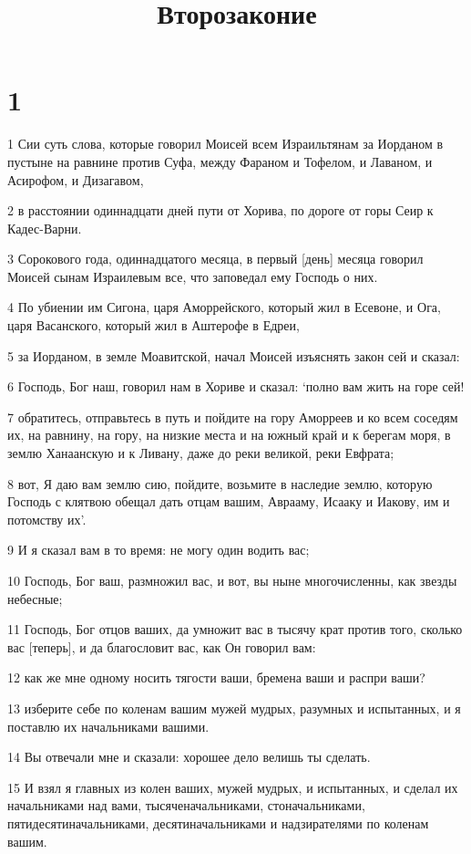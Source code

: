 

\title{Второзаконие}


\chapter{1}

\par 1 Сии суть слова, которые говорил Моисей всем Израильтянам за Иорданом в пустыне на равнине против Суфа, между Фараном и Тофелом, и Лаваном, и Асирофом, и Дизагавом,
\par 2 в расстоянии одиннадцати дней пути от Хорива, по дороге от горы Сеир к Кадес-Варни.
\par 3 Сорокового года, одиннадцатого месяца, в первый [день] месяца говорил Моисей сынам Израилевым все, что заповедал ему Господь о них.
\par 4 По убиении им Сигона, царя Аморрейского, который жил в Есевоне, и Ога, царя Васанского, который жил в Аштерофе в Едреи,
\par 5 за Иорданом, в земле Моавитской, начал Моисей изъяснять закон сей и сказал:
\par 6 Господь, Бог наш, говорил нам в Хориве и сказал: `полно вам жить на горе сей!
\par 7 обратитесь, отправьтесь в путь и пойдите на гору Аморреев и ко всем соседям их, на равнину, на гору, на низкие места и на южный край и к берегам моря, в землю Ханаанскую и к Ливану, даже до реки великой, реки Евфрата;
\par 8 вот, Я даю вам землю сию, пойдите, возьмите в наследие землю, которую Господь с клятвою обещал дать отцам вашим, Аврааму, Исааку и Иакову, им и потомству их'.
\par 9 И я сказал вам в то время: не могу один водить вас;
\par 10 Господь, Бог ваш, размножил вас, и вот, вы ныне многочисленны, как звезды небесные;
\par 11 Господь, Бог отцов ваших, да умножит вас в тысячу крат против того, сколько вас [теперь], и да благословит вас, как Он говорил вам:
\par 12 как же мне одному носить тягости ваши, бремена ваши и распри ваши?
\par 13 изберите себе по коленам вашим мужей мудрых, разумных и испытанных, и я поставлю их начальниками вашими.
\par 14 Вы отвечали мне и сказали: хорошее дело велишь ты сделать.
\par 15 И взял я главных из колен ваших, мужей мудрых, и испытанных, и сделал их начальниками над вами, тысяченачальниками, стоначальниками, пятидесятиначальниками, десятиначальниками и надзирателями по коленам вашим.
